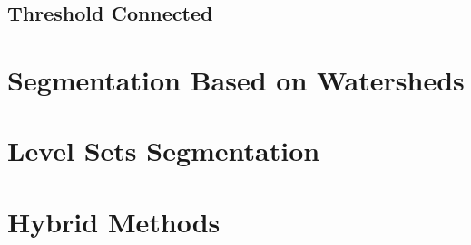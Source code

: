 \subsection{Threshold Connected}

\section{Segmentation Based on Watersheds}
\label{sec:WatershedSegmentation}



\section{Level Sets Segmentation}
\label{sec:LevelSetsSegmentation}



\section{Hybrid Methods} 
\label{sec:HybridSegmentationMethods}




